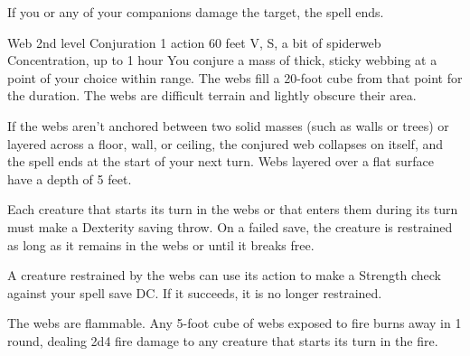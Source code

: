 \documentclass[10pt,a4paper,twoside,bg=print,twocolumn,openany,nodeprecatedcode]{dndbook}
\begin{document}
If you or any of your companions damage the target, the spell ends.



\DndSpellHeader%
{Web}
{2nd level Conjuration}
{1 action}
{60 feet}
{V, S, a bit of spiderweb}
{Concentration, up to 1 hour}
You conjure a mass of thick, sticky webbing at a point of your choice within range. The webs fill a 20-foot cube from that point for the duration. The webs are difficult terrain and lightly obscure their area.

If the webs aren't anchored between two solid masses (such as walls or trees) or layered across a floor, wall, or ceiling, the conjured web collapses on itself, and the spell ends at the start of your next turn. Webs layered over a flat surface have a depth of 5 feet.

Each creature that starts its turn in the webs or that enters them during its turn must make a Dexterity saving throw. On a failed save, the creature is restrained as long as it remains in the webs or until it breaks free.

A creature restrained by the webs can use its action to make a Strength check against your spell save DC. If it succeeds, it is no longer restrained.

The webs are flammable. Any 5-foot cube of webs exposed to fire burns away in 1 round, dealing 2d4 fire damage to any creature that starts its turn in the fire.
\end{document}
